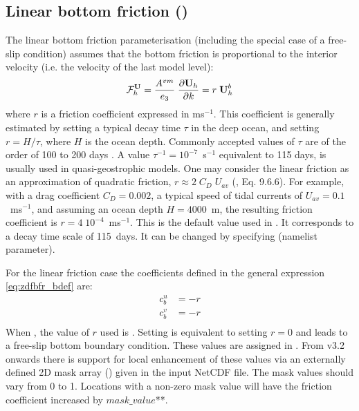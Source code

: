 \documentclass[../tex_main/NEMO_manual]{subfiles}
\begin{document}
\subsection{Linear bottom friction (\protect{})}
\label{subsec:ZDF_bfr_linear}

The linear bottom friction parameterisation (including the special case of a free-slip condition) assumes that
the bottom friction is proportional to the interior velocity (i.e. the velocity of the last model level):
\begin{equation} \label{eq:zdfbfr_linear}
{\cal F}_h^\textbf{U} = \frac{A^{vm}}{e_3} \; \frac{\partial \textbf{U}_h}{\partial k} = r \; \textbf{U}_h^b
\end{equation}
where $r$ is a friction coefficient expressed in ms$^{-1}$.
This coefficient is generally estimated by setting a typical decay time $\tau$ in the deep ocean, 
and setting $r = H / \tau$, where $H$ is the ocean depth.
Commonly accepted values of $\tau$ are of the order of 100 to 200 days \citep{Weatherly_JMR84}.
A value $\tau^{-1} = 10^{-7}$~s$^{-1}$ equivalent to 115 days, is usually used in quasi-geostrophic models.
One may consider the linear friction as an approximation of quadratic friction, $r \approx 2\;C_D\;U_{av}$
(\citet{Gill1982}, Eq. 9.6.6).
For example, with a drag coefficient $C_D = 0.002$, a typical speed of tidal currents of $U_{av} =0.1$~m\;s$^{-1}$,
and assuming an ocean depth $H = 4000$~m, the resulting friction coefficient is $r = 4\;10^{-4}$~m\;s$^{-1}$.
This is the default value used in \NEMO. It corresponds to a decay time scale of 115~days.
It can be changed by specifying  (namelist parameter).

For the linear friction case the coefficients defined in the general expression \autoref{eq:zdfbfr_bdef} are: 
\begin{equation} \label{eq:zdfbfr_linbfr_b}
\begin{split}
 c_b^u &= - r\\
 c_b^v &= - r\\
\end{split}
\end{equation}
When , the value of $r$ used is .
Setting  is equivalent to setting $r=0$ and
leads to a free-slip bottom boundary condition.
These values are assigned in .
From v3.2 onwards there is support for local enhancement of these values via an externally defined 2D mask array
() given in the  input NetCDF file.
The mask values should vary from 0 to 1.
Locations with a non-zero mask value will have the friction coefficient increased by
$mask\_value$**.
\end{document}
